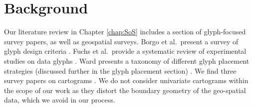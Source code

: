 \section{Background}
Our literature review in Chapter \ref{chap:SoS} includes a section of glyph-focused survey papers, as well as geospatial surveys. Borgo et al.\ present a survey of glyph design criteria \cite{borgo2013glyph}. Fuchs et al.\ provide a systematic review of experimental studies on data glyphs \cite{fuchs2016systematic}.
Ward presents a taxonomy of different glyph placement strategies (discussed further in the glyph placement section) \cite{ward2002taxonomy}. We find three survey papers on cartograms \cite{tobler2004thirty, nusrat2015task, nusrat2016state}. We do not consider univariate cartograms within the scope of our work as they distort the boundary geometry of the geo-spatial data, which we avoid in our process.

